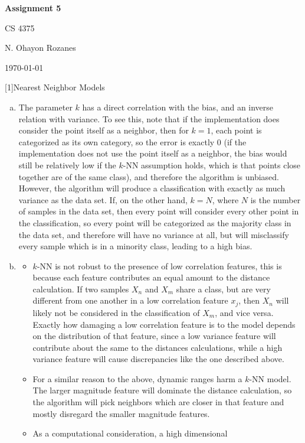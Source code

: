 \documentclass{article} %
\newcommand{\question}[2][]{
  \begin{flushleft}
    \textbf{Question #1}: \textit{#2}

\end{flushleft}}
\newcommand{\maketitletwo}[2][]{
  \begin{center}
    \Large{\textbf{Assignment #1}

    CS 4375} %
    \vspace{5pt}

    \normalsize{N. Ohayon Rozanes  %

    \today}        %
    \vspace{15pt}

\end{center}}
\begin{document}
\maketitletwo[5]  %

\question[1]{Nearest Neighbor Models}
\begin{enumerate}[(a)]
  \item The parameter $k$ has a direct correlation with the bias,
    and an inverse relation with variance. To see this, note that if
    the implementation does consider the point itself as a
    neighbor, then for $k=1$, each point is categorized as its own
    category, so the error is exactly $0$ (if the implementation does
      not use the point itself as a neighbor, the bias would still be
      relatively low if the $k$-NN assumption holds, which is that
    points close together are of the same class), and therefore the
    algorithm is unbiased. However, the algorithm will produce a
    classification with exactly as much variance as the data set. If,
    on the other hand, $k = N$, where $N$ is the number of samples in
    the data set, then every point will consider every other point in
    the classification, so every point will be categorized as the
    majority class in the data set, and therefore will have no
    variance at all, but will misclassify every sample which is in a
    minority class, leading to a high bias.
  \item
    \begin{itemize}
      \item $k$-NN is not robust to the presence of low correlation
        features, this is because each feature contributes an equal
        amount to the distance calculation. If two samples $X_n$ and
        $X_m$ share a class, but are very different from one another
        in a low correlation feature $x_j$, then $X_n$ will likely
        not be considered in the classification of $X_m$, and vice
        versa. Exactly how damaging a low correlation feature is to
        the model depends on the distribution of that feature, since
        a low variance feature will contribute about the same to the
        distances calculations, while a high variance feature will
        cause discrepancies like the one described above.
      \item For a similar reason to the above, dynamic ranges harm a
        $k$-NN model. The larger magnitude feature will dominate the
        distance calculation, so the algorithm will pick neighbors
        which are closer in that feature and mostly disregard the
        smaller magnitude features.
      \item As a computational consideration, a high dimensional

\end{itemize}
\end{enumerate}
\end{document}
